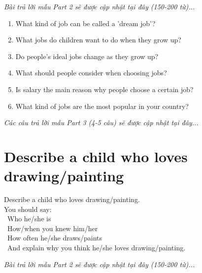 \vspace{1em}
\textit{Bài trả lời mẫu Part 2 sẽ được cập nhật tại đây (150-200 từ)...}
\vspace{2em}

\begin{ieltsprompt}
\begin{enumerate}[itemsep=4pt]
    \item What kind of job can be called a 'dream job'?
    \item What jobs do children want to do when they grow up?
    \item Do people's ideal jobs change as they grow up?
    \item What should people consider when choosing jobs?
    \item Is salary the main reason why people choose a certain job?
    \item What kind of jobs are the most popular in your country?
\end{enumerate}
\end{ieltsprompt}

\vspace{1em}
\textit{Các câu trả lời mẫu Part 3 (4-5 câu) sẽ được cập nhật tại đây...}
\vspace{2em}

\section{Describe a child who loves drawing/painting}
\begin{ieltsprompt}
Describe a child who loves drawing/painting. \\
You should say: \\
\textbullet\ Who he/she is \\
\textbullet\ How/when you knew him/her \\
\textbullet\ How often he/she draws/paints \\
\textbullet\ And explain why you think he/she loves drawing/painting. \\
\end{ieltsprompt}

\vspace{1em}
\textit{Bài trả lời mẫu Part 2 sẽ được cập nhật tại đây (150-200 từ)...}
\vspace{2em}


